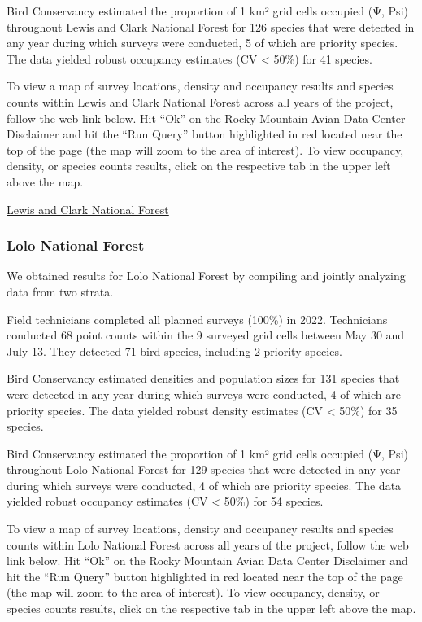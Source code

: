 \documentclass[
  letterpaper,
  DIV=11,
  numbers=noendperiod,
  oneside]{scrreprt}
\begin{document}
Bird Conservancy estimated the proportion of 1 km² grid cells occupied
(Ψ, Psi) throughout Lewis and Clark National Forest for 126 species that
were detected in any year during which surveys were conducted, 5 of
which are priority species. The data yielded robust occupancy estimates
(CV \textless{} 50\%) for 41 species.

To view a map of survey locations, density and occupancy results and
species counts within Lewis and Clark National Forest across all years
of the project, follow the web link below. Hit ``Ok'' on the Rocky
Mountain Avian Data Center Disclaimer and hit the ``Run Query'' button
highlighted in red located near the top of the page (the map will zoom
to the area of interest). To view occupancy, density, or species counts
results, click on the respective tab in the upper left above the map.

\href{http://www.rmbo.org/new_site/adc/QueryWindow.aspx\#N4IgzgrgDgpgTmALnAhoiBbEAuABCAGRgHcBLMXFAOwBNcBhAGxTgGtcA5NUgeypUa4AYjzgwkIAL5A=}{Lewis
and Clark National Forest}

\hypertarget{lolo-national-forest}{%
\subsubsection{Lolo National Forest}\label{lolo-national-forest}}

We obtained results for Lolo National Forest by compiling and jointly
analyzing data from two strata.

Field technicians completed all planned surveys (100\%) in 2022.
Technicians conducted 68 point counts within the 9 surveyed grid cells
between May 30 and July 13. They detected 71 bird species, including 2
priority species.

Bird Conservancy estimated densities and population sizes for 131
species that were detected in any year during which surveys were
conducted, 4 of which are priority species. The data yielded robust
density estimates (CV \textless{} 50\%) for 35 species.

Bird Conservancy estimated the proportion of 1 km² grid cells occupied
(Ψ, Psi) throughout Lolo National Forest for 129 species that were
detected in any year during which surveys were conducted, 4 of which are
priority species. The data yielded robust occupancy estimates (CV
\textless{} 50\%) for 54 species.

To view a map of survey locations, density and occupancy results and
species counts within Lolo National Forest across all years of the
project, follow the web link below. Hit ``Ok'' on the Rocky Mountain
Avian Data Center Disclaimer and hit the ``Run Query'' button
highlighted in red located near the top of the page (the map will zoom
to the area of interest). To view occupancy, density, or species counts
results, click on the respective tab in the upper left above the map.
\end{document}
